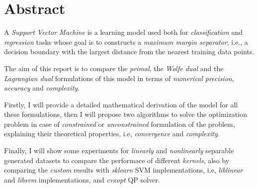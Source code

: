 \section{Abstract}

A \emph{Support Vector Machine} is a learning model used both for \emph{classification} and \emph{regression} tasks whose goal is to constructs a \emph{maximum margin separator}, i.e., a decision boundary with the largest distance from the nearest training data points.

The aim of this report is to compare the \emph{primal}, the \emph{Wolfe dual} and the \emph{Lagrangian dual} formulations of this model in terms of \emph{numerical precision}, \emph{accuracy} and \emph{complexity}.

Firstly, I will provide a detailed mathematical derivation of the model for all these formulations, then I will propose two algorithms to solve the optimization problem in case of \emph{constrained} or \emph{unconstrained} formulation of the problem, explaining their theoretical properties, i.e, \emph{convergence} and \emph{complexity}.

Finally, I will show some experiments for \emph{linearly} and \emph{nonlinearly} separable generated datasets to compare the performace of different \emph{kernels}, also by comparing the \emph{custom} results with \emph{sklearn} SVM implementations, i.e, \emph{liblinear} and \emph{libsvm} implementations, and \emph{cvxopt} QP solver.
